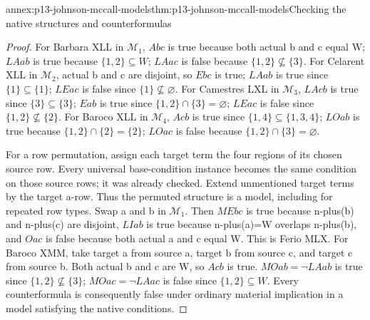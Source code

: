 \begin{annexitem}{annex:p13-johnson-mccall-models}{thm:p13-johnson-mccall-models}{Checking the native structures and counterformulas}
\begin{proof}
For Barbara XLL in \(\mathcal M_1\), \(Abc\) is true because both
actual b and c equal W; \(LAab\) is true because \(\{1,2\}\subseteq W\);
\(LAac\) is false because \(\{1,2\}\nsubseteq\{3\}\).
For Celarent XLL in \(\mathcal M_2\), actual b and c are disjoint,
so \(Ebc\) is true; \(LAab\) is true since \(\{1\}\subseteq\{1\}\);
\(LEac\) is false since \(\{1\}\nsubseteq\varnothing\).
For Camestres LXL in \(\mathcal M_3\), \(LAcb\) is true since
\(\{3\}\subseteq\{3\}\); \(Eab\) is true since
\(\{1,2\}\cap\{3\}=\varnothing\); \(LEac\) is false since
\(\{1,2\}\nsubseteq\{2\}\).
For Baroco XLL in \(\mathcal M_4\), \(Acb\) is true since
\(\{1,4\}\subseteq\{1,3,4\}\); \(LOab\) is true because
\(\{1,2\}\cap\{2\}=\{2\}\); \(LOac\) is false because
\(\{1,2\}\cap\{3\}=\varnothing\).

For a row permutation, assign each target term the four regions of its
chosen source row. Every universal base-condition instance becomes the
same condition on those source rows; it was already checked. Extend
unmentioned target terms by the target a-row. Thus the permuted structure
is a model, including for repeated row types.
Swap a and b in \(\mathcal M_1\). Then \(MEbc\) is true because
n-plus(b) and n-plus(c) are disjoint, \(LIab\) is true because
n-plus(a)=W overlaps n-plus(b), and \(Oac\) is false because both
actual a and c equal W. This is Ferio MLX.
For Baroco XMM, take target a from source a, target b from source c,
and target c from source b. Both actual b and c are W, so \(Acb\) is
true. \(MOab=\neg LAab\) is true since \(\{1,2\}\nsubseteq\{3\}\);
\(MOac=\neg LAac\) is false since \(\{1,2\}\subseteq W\).
Every counterformula is consequently false under ordinary material
implication in a model satisfying the native conditions.
\end{proof}
\end{annexitem}


